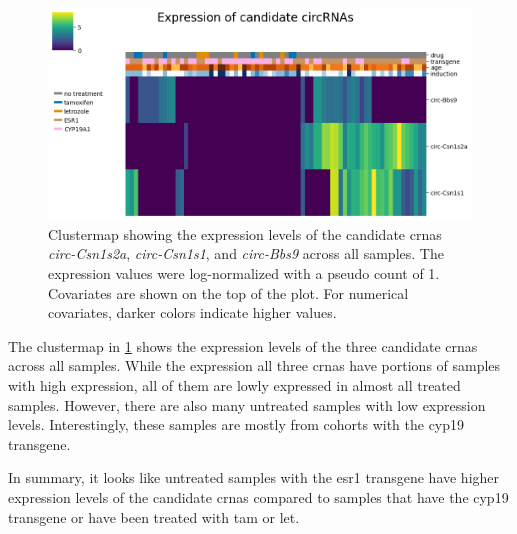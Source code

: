 \begin{figure}[H] \centering

    \includegraphics[width=\textwidth]{chapters/4_results_and_discussion/figures/heatmap.png}
    \caption{Clustermap showing the expression levels of the candidate
        \glspl{crna} \textit{circ-Csn1s2a}, \textit{circ-Csn1s1}, and
        \textit{circ-Bbs9} across all samples.
        The expression values were log-normalized with a pseudo count of 1.
        Covariates are shown on the top of the plot.
        For numerical covariates, darker colors indicate higher values.
    }
    \label{fig:candidate_heatmap}
\end{figure}

The clustermap in \cref{fig:candidate_heatmap} shows the expression levels of
the three candidate \glspl{crna} across all samples.
While the expression all three \glspl{crna} have portions of samples with high
expression, all of them are lowly expressed in almost all treated samples.
However, there are also many untreated samples with low expression levels.
Interestingly, these samples are mostly from cohorts with the \gls{cyp19}
transgene.

In summary, it looks like untreated samples with the \gls{esr1} transgene have
higher expression levels of the candidate \glspl{crna} compared to samples that
have the \gls{cyp19} transgene or have been treated with \gls{tam} or
\gls{let}.
